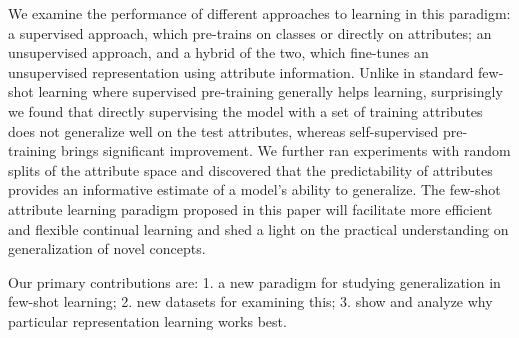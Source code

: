 We examine the performance of different approaches to learning in this paradigm: a supervised approach, which pre-trains on classes or directly on attributes;
an unsupervised approach, and a hybrid of the two, which fine-tunes an unsupervised representation using attribute information. Unlike in standard
few-shot learning where supervised pre-training generally helps learning,
surprisingly we found that directly supervising the model with a set of
training attributes does not generalize well on the test attributes, whereas
self-supervised pre-training brings significant improvement. 
We further ran
experiments with random splits of the attribute space and discovered that the
predictability of attributes provides an informative estimate of a model's
ability to generalize. The few-shot attribute learning paradigm proposed in
this paper will facilitate more efficient and flexible continual learning and
shed a light on the practical understanding on generalization of novel
concepts. 

Our primary contributions are:
1. a new paradigm for studying generalization in few-shot learning; 2. new datasets for examining this; 3. show and analyze why particular representation learning works best.



